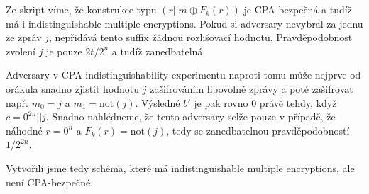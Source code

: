 \documentclass{scrartcl}
\begin{document}
    Ze skript víme, že konstrukce typu $(r||m \oplus F_k(r))$ je CPA-bezpečná a tudíž má i indistinguishable multiple encryptions. Pokud si adversary nevybral za jednu ze zpráv $j$, nepřidává tento suffix žádnou rozlišovací hodnotu. Pravděpodobnost zvolení $j$ je pouze $2t/2^n$ a tudíž zanedbatelná.
    
    Adversary v CPA indistinguishability experimentu naproti tomu může nejprve od orákula snadno zjistit hodnotu $j$ zašifrováním libovolné zprávy a poté zašifrovat např. $m_0 = j$ a $m_1 = \text{not}(j)$. Výsledné $b'$ je pak rovno 0 právě tehdy, když $c = 0^{2n}||j$. Snadno nahlédneme, že tento adversary selže pouze v případě, že náhodné $r = 0^n$ a $F_k(r) = \text{not}(j)$, tedy se zanedbatelnou pravděpodobností $1/2^{2n}$. 

    Vytvořili jsme tedy schéma, které má indistinguishable multiple encryptions, ale není CPA-bezpečné.
\end{document}
